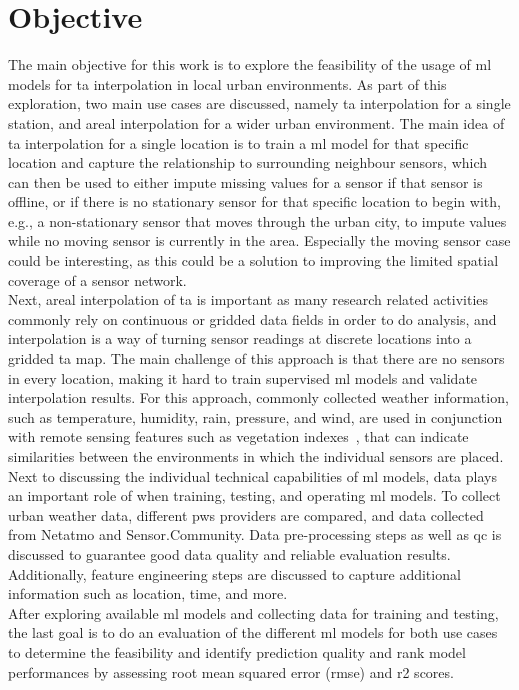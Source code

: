 \section{Objective}

The main objective for this work is to explore the feasibility of the usage of \gls{ml} models for \gls{ta} interpolation in local urban environments. As part of this exploration, two main use cases are discussed, namely \gls{ta} interpolation for a single station, and areal interpolation for a wider urban environment. The main idea of \gls{ta} interpolation for a single location is to train a \gls{ml} model for that specific location and capture the relationship to surrounding neighbour sensors, which can then be used to either impute missing values for a sensor if that sensor is offline, or if there is no stationary sensor for that specific location to begin with, e.g., a non-stationary sensor that moves through the urban city, to impute values while no moving sensor is currently in the area. Especially the moving sensor case could be interesting, as this could be a solution to improving the limited spatial coverage of a sensor network.\\
Next, areal interpolation of \gls{ta} is important as many research related activities commonly rely on continuous or gridded data fields in order to do analysis, and interpolation is a way of turning sensor readings at discrete locations into a gridded \gls{ta} map. The main challenge of this approach is that there are no sensors in every location, making it hard to train supervised \gls{ml} models and validate interpolation results. For this approach, commonly collected weather information, such as temperature, humidity, rain, pressure, and wind, are used in conjunction with remote sensing features such as vegetation indexes~\cite{alonso2020new}, that can indicate similarities between the environments in which the individual sensors are placed.\\
Next to discussing the individual technical capabilities of \gls{ml} models, data plays an important role of when training, testing, and operating \gls{ml} models. To collect urban weather data, different \gls{pws} providers are compared, and data collected from Netatmo and Sensor.Community. Data pre-processing steps as well as \gls{qc} is discussed to guarantee good data quality and reliable evaluation results. Additionally, feature engineering steps are discussed to capture additional information such as location, time, and more.\\
After exploring available \gls{ml} models and collecting data for training and testing, the last goal is to do an evaluation of the different \gls{ml} models for both use cases to determine the feasibility and identify prediction quality and rank model performances by assessing root mean squared error (\gls{rmse}) and \gls{r2} scores.

